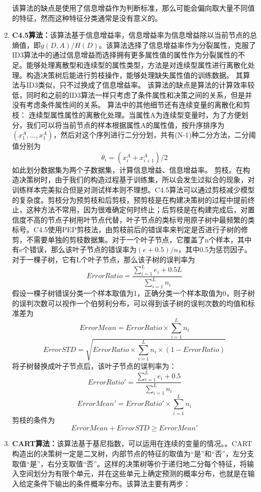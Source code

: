 \documentclass[12pt,a4paper]{article}
\theoremstyle{definition}
\begin{document}
\begin{enumerate}
{\begin{algorithm}
		\end{algorithm}
	
		该算法的缺点是使用了信息增益作为判断标准，那么可能会偏向取大量不同值的特征，然而这种特征分类通常是没有意义的。
	} 
	\item{
		\textbf{C4.5算法：}该算法基于信息增益率，信息增益率为信息增益除以当前节点的总熵值，即$g(D,A)/H(D)$。该算法选择了信息增益率作为分裂属性，克服了ID3算法中的通过信息增益而选择拥有更多属性值的属性作为分裂属性的不足。能够处理离散型和连续型的属性类型，方法是对连续型属性进行离散化处理。构造决策树后能进行剪枝操作，能够处理缺失属性值的训练数据。
		其算法与ID3类似，只不过换成了信息增益率。
		该算法的缺点是算法的计算效率较低，同时和之前的ID3算法一样只考虑了条件属性和决策之间的关系，但是并没有考虑条件属性间的关系。
		算法中的其他细节还有连续变量的离散化和剪枝：
		连续型属性属性的离散化处理。当属性A为连续型变量时，为了方便划分，我们可以将当前节点的样本根据属性A的属性值，按升序排序为$(x^{A}_{1},\ldots,x^{A}_{1})$，然后对这个序列进行二分分划，共有(N-1)种二分方法，二分阈值分别为
		$$\theta_i=(x^{A}_{i}+x^{A}_{i+1})/2$$
		如此划分数据集为两个子数据集，计算信息增益、信息增益率。
		剪枝。在构造决策树时，由于我们的构造过程基于训练集，所以会发生过拟合的现象，对训练样本完美拟合但是对测试样本则不理想。C4.5算法可以通过剪枝减少模型的复杂度。剪枝分为预剪枝和后剪枝，预剪枝是在构建决策树的过程中提前终止，这种方法不常用，因为很难确定何时终止；后剪枝是在构建完成后，对置信度不高的节点子树用叶节点代替，叶子节点的类标号用原子树中最频繁的类标号。C4.5使用PEP剪枝法，由剪枝前后的错误率来判定是否进行子树的修剪，不需要单独的剪枝数据集。对于一个叶子节点，它覆盖了n个样本，其中有e个错误，那么该叶子节点的错误率为$(e+0.5)/n$，其中0.5为惩罚因子。对于一棵子树，它有L个叶子节点，那么该子树的误判率为
		$$ErrorRatio=\frac{\sum_{i=1}^{L}e_i+0.5L}{\sum_{i=1}^{L}n_i}$$
		假设一棵子树错误分类一个样本取值为1，正确分类一个样本取值为0，则子树的误判次数可以视作一个伯努利分布，可以得到该子树的误判次数的均值和标准差为
		$$ErrorMean=ErrorRatio\times\sum_{i=1}^{L}n_i$$
		$$ErrorSTD=\sqrt{ErrorRatio\times\sum_{i=1}^{L}n_i\times(1-ErrorRatio)}$$
		将子树替换成叶子节点后，该叶子节点的误判率为：
		$$ErrorRatio'=\frac{\sum_{i=1}^{L}e_i+0.5}{\sum_{i=1}^{L}n_i}$$
		$$ErrorMean'=ErrorRatio'\times\sum_{i=1}^{L}n_i$$
		剪枝的条件为
		$$ErrorMean+ErrorSTD\ge ErrorMean'$$
	}
	\item{
		\textbf{CART算法：}该算法基于基尼指数，可以运用在连续的变量的情况。。CART构造出的决策树一定是二叉树，内部节点的特征的取值为“是”和“否”，左分支取值“是”，右分支取值“否”。这样的决策树等价于递归地二分每个特征，将输入空间划分为有限个单元，并在这些单元上确定预测的概率分布，也就是在输入给定条件下输出的条件概率分布。该算法主要有两步：
}
\end{enumerate}
\end{document}
